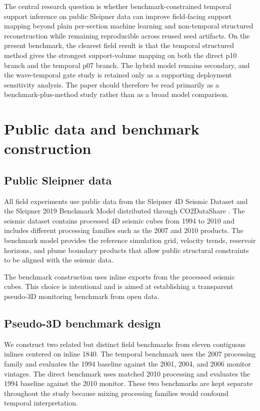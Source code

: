 \documentclass[preprint,12pt]{elsarticle}
\begin{document}
The central research question is whether benchmark-constrained temporal support inference on public Sleipner data can improve field-facing support mapping beyond plain per-section machine learning and non-temporal structured reconstruction while remaining reproducible across reused seed artifacts. On the present benchmark, the clearest field result is that the temporal structured method gives the strongest support-volume mapping on both the direct p10 branch and the temporal p07 branch. The hybrid model remains secondary, and the wave-temporal gate study is retained only as a supporting deployment sensitivity analysis. The paper should therefore be read primarily as a benchmark-plus-method study rather than as a broad model comparison.

\section{Public data and benchmark construction}

\subsection{Public Sleipner data}

All field experiments use public data from the Sleipner 4D Seismic Dataset and the Sleipner 2019 Benchmark Model distributed through CO2DataShare \citep{equinor2020seismic,equinor2020benchmark}. The seismic dataset contains processed 4D seismic cubes from 1994 to 2010 and includes different processing families such as the 2007 and 2010 products. The benchmark model provides the reference simulation grid, velocity trends, reservoir horizons, and plume boundary products that allow public structural constraints to be aligned with the seismic data.

The benchmark construction uses inline exports from the processed seismic cubes. This choice is intentional and is aimed at establishing a transparent pseudo-3D monitoring benchmark from open data.

\subsection{Pseudo-3D benchmark design}

We construct two related but distinct field benchmarks from eleven contiguous inlines centered on inline 1840. The temporal benchmark uses the 2007 processing family and evaluates the 1994 baseline against the 2001, 2004, and 2006 monitor vintages. The direct benchmark uses matched 2010 processing and evaluates the 1994 baseline against the 2010 monitor. These two benchmarks are kept separate throughout the study because mixing processing families would confound temporal interpretation.
\end{document}
